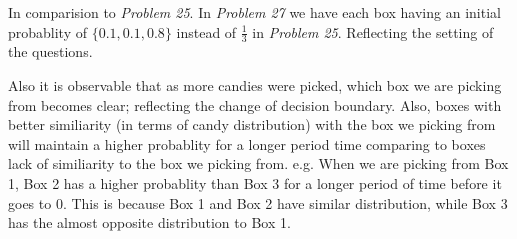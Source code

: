 \documentclass[12pt]{article}
\begin{document}
In comparision to \textit{Problem 25}. In \textit{Problem 27} we have each box having an initial probablity of $\{0.1, 0.1, 0.8\}$ instead of $\frac{1}{3}$ in \textit{Problem 25}. Reflecting the setting of the questions.

Also it is observable that as more candies were picked, which box we are picking from becomes clear; reflecting the change of decision boundary. Also, boxes with better similiarity (in terms of candy distribution) with the box we picking from will maintain a higher probablity for a longer period time comparing to boxes lack of similiarity to the box we picking from. e.g. When we are picking from Box 1, Box 2 has a higher probablity than Box 3 for a longer period of time before it goes to 0. This is because Box 1 and Box 2 have similar distribution, while Box 3 has the almost opposite distribution to Box 1.
\end{document}
